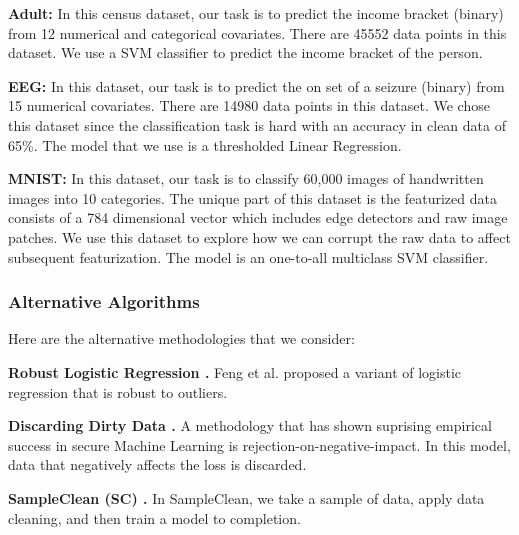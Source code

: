 \vspace{0.5em}

\noindent\textbf{Adult: } In this census dataset, our task is to predict the income bracket (binary) from 12 numerical and categorical covariates. There are 45552 data points in this dataset. We use a SVM classifier to predict the income bracket of the person.

\vspace{0.5em}

\noindent\textbf{EEG: } In this dataset, our task is to predict the on set of a seizure (binary) from 15 numerical covariates. There are 14980 data points in this dataset. We chose this dataset since the classification task is hard with an accuracy in clean data of 65\%. The model that we use is a thresholded Linear Regression.

\vspace{0.5em}

\noindent\textbf{MNIST: } In this dataset, our task is to classify 60,000 images of handwritten images into 10 categories. The unique part of this dataset is the featurized data consists of a 784 dimensional vector which includes edge detectors and raw image patches. We use this dataset to explore how we can corrupt the raw data to affect subsequent featurization. The model is an one-to-all multiclass SVM classifier. 

\subsubsection{Alternative Algorithms}
\noindent Here are the alternative methodologies that we consider:

\vspace{0.5em}

\noindent\textbf{Robust Logistic Regression \cite{feng2014robust}. } Feng et al. proposed a variant of logistic regression that is robust to outliers. 

\vspace{0.5em}

\noindent\textbf{Discarding Dirty Data \cite{li2014improved}. } A methodology that has shown suprising empirical success in secure Machine Learning is rejection-on-negative-impact. In this model, data that negatively affects the loss is discarded.

\vspace{0.5em}

\noindent\textbf{SampleClean (SC) \cite{wang1999sample}. } In SampleClean, we take a sample of data, apply data cleaning, and then train a model to completion.

